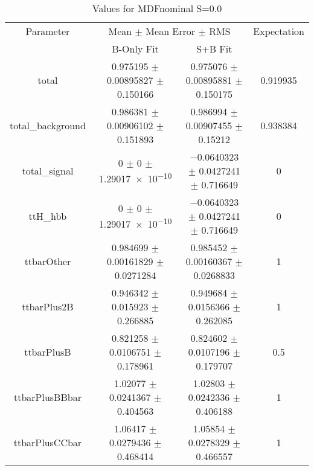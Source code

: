 \begin{table}
\centering
\caption{Values for MDFnominal S=0.0}
\begin{tabular}{cccc}
\toprule
Parameter & \multicolumn{2}{c}{Mean $\pm$ Mean Error $\pm$ RMS} & Expectation\\
 & B-Only Fit & S+B Fit & \\
\midrule
total & \num{0.975195} $\pm$ \num{0.00895827} $\pm$ \num{0.150166} & \num{0.975076} $\pm$ \num{0.00895881} $\pm$ \num{0.150175} & \num{0.919935}\\
total\_background & \num{0.986381} $\pm$ \num{0.00906102} $\pm$ \num{0.151893} & \num{0.986994} $\pm$ \num{0.00907455} $\pm$ \num{0.15212} & \num{0.938384}\\
total\_signal & \num{0} $\pm$ \num{0} $\pm$ \num{1.29017e-10} & \num{-0.0640323} $\pm$ \num{0.0427241} $\pm$ \num{0.716649} & \num{0}\\
ttH\_hbb & \num{0} $\pm$ \num{0} $\pm$ \num{1.29017e-10} & \num{-0.0640323} $\pm$ \num{0.0427241} $\pm$ \num{0.716649} & \num{0}\\
ttbarOther & \num{0.984699} $\pm$ \num{0.00161829} $\pm$ \num{0.0271284} & \num{0.985452} $\pm$ \num{0.00160367} $\pm$ \num{0.0268833} & \num{1}\\
ttbarPlus2B & \num{0.946342} $\pm$ \num{0.015923} $\pm$ \num{0.266885} & \num{0.949684} $\pm$ \num{0.0156366} $\pm$ \num{0.262085} & \num{1}\\
ttbarPlusB & \num{0.821258} $\pm$ \num{0.0106751} $\pm$ \num{0.178961} & \num{0.824602} $\pm$ \num{0.0107196} $\pm$ \num{0.179707} & \num{0.5}\\
ttbarPlusBBbar & \num{1.02077} $\pm$ \num{0.0241367} $\pm$ \num{0.404563} & \num{1.02803} $\pm$ \num{0.0242336} $\pm$ \num{0.406188} & \num{1}\\
ttbarPlusCCbar & \num{1.06417} $\pm$ \num{0.0279436} $\pm$ \num{0.468414} & \num{1.05854} $\pm$ \num{0.0278329} $\pm$ \num{0.466557} & \num{1}\\
\bottomrule
\end{tabular}
\end{table}